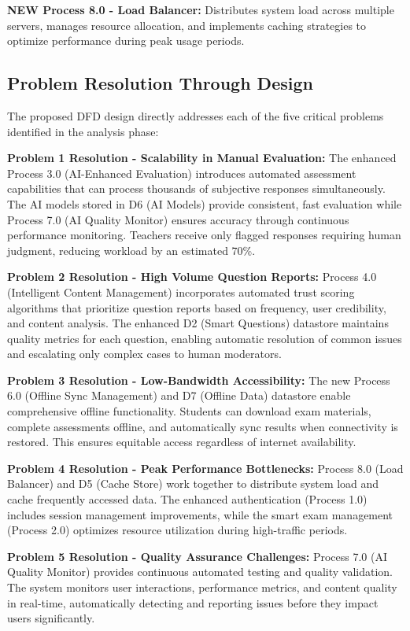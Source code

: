 \documentclass[12pt,a4paper,oneside]{book}
\begin{document}
\textbf{NEW Process 8.0 - Load Balancer:} Distributes system load across multiple servers, manages resource allocation, and implements caching strategies to optimize performance during peak usage periods.

\subsection{Problem Resolution Through Design}

The proposed DFD design directly addresses each of the five critical problems identified in the analysis phase:

\textbf{Problem 1 Resolution - Scalability in Manual Evaluation:}
The enhanced Process 3.0 (AI-Enhanced Evaluation) introduces automated assessment capabilities that can process thousands of subjective responses simultaneously. The AI models stored in D6 (AI Models) provide consistent, fast evaluation while Process 7.0 (AI Quality Monitor) ensures accuracy through continuous performance monitoring. Teachers receive only flagged responses requiring human judgment, reducing workload by an estimated 70\%.

\textbf{Problem 2 Resolution - High Volume Question Reports:}
Process 4.0 (Intelligent Content Management) incorporates automated trust scoring algorithms that prioritize question reports based on frequency, user credibility, and content analysis. The enhanced D2 (Smart Questions) datastore maintains quality metrics for each question, enabling automatic resolution of common issues and escalating only complex cases to human moderators.

\textbf{Problem 3 Resolution - Low-Bandwidth Accessibility:}
The new Process 6.0 (Offline Sync Management) and D7 (Offline Data) datastore enable comprehensive offline functionality. Students can download exam materials, complete assessments offline, and automatically sync results when connectivity is restored. This ensures equitable access regardless of internet availability.

\textbf{Problem 4 Resolution - Peak Performance Bottlenecks:}
Process 8.0 (Load Balancer) and D5 (Cache Store) work together to distribute system load and cache frequently accessed data. The enhanced authentication (Process 1.0) includes session management improvements, while the smart exam management (Process 2.0) optimizes resource utilization during high-traffic periods.

\textbf{Problem 5 Resolution - Quality Assurance Challenges:}
Process 7.0 (AI Quality Monitor) provides continuous automated testing and quality validation. The system monitors user interactions, performance metrics, and content quality in real-time, automatically detecting and reporting issues before they impact users significantly.
\end{document}
